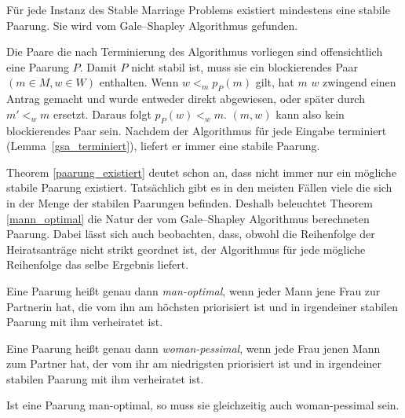 \begin{Theorem}
\label{paarung_existiert}
  Für jede Instanz des Stable Marriage Problems existiert mindestens eine stabile Paarung. Sie wird vom Gale–Shapley Algorithmus gefunden.
\end{Theorem}

\begin{Beweis}
\label{paarung_existiert_bew}
  Die Paare die nach Terminierung des Algorithmus vorliegen sind offensichtlich eine Paarung $P$. Damit $P$ nicht stabil ist, muss sie ein blockierendes Paar $(m \in M,w \in W)$ enthalten. Wenn $w <_{m} p_{P}(m)$ gilt, hat $m$ $w$ zwingend einen Antrag gemacht und wurde entweder direkt abgewiesen, oder später durch $m' <_{w} m$ ersetzt. Daraus folgt $p_{P}(w) <_{w} m$. $(m,w)$ kann also kein blockierendes Paar sein. Nachdem der Algorithmus für jede Eingabe terminiert (Lemma~\ref{gsa_terminiert}), liefert er immer eine stabile Paarung.
\end{Beweis}

Theorem \ref{paarung_existiert} deutet schon an, dass nicht immer nur ein mögliche stabile Paarung existiert. Tatsächlich gibt es in den meisten Fällen viele die sich in der Menge der stabilen Paarungen befinden. Deshalb beleuchtet Theorem \ref{mann_optimal} die Natur der vom Gale–Shapley Algorithmus berechneten Paarung. Dabei lässt sich auch beobachten, dass, obwohl die Reihenfolge der Heiratsanträge nicht strikt geordnet ist, der Algorithmus für jede mögliche Reihenfolge das selbe Ergebnis liefert.

\begin{Definition}
\label{man_optimal}
  Eine Paarung heißt genau dann \textit{man-optimal}, wenn jeder Mann jene Frau zur Partnerin hat, die vom ihn am höchsten priorisiert ist und in irgendeiner stabilen Paarung mit ihm verheiratet ist.
\end{Definition}

\begin{Definition}
\label{woman_pessimal}
  Eine Paarung heißt genau dann \textit{woman-pessimal}, wenn jede Frau jenen Mann zum Partner hat, der vom ihr am niedrigsten priorisiert ist und in irgendeiner stabilen Paarung mit ihm verheiratet ist.
\end{Definition}

\begin{Lemma}
\label{man_optimal_woman_pessimal}
  Ist eine Paarung man-optimal, so muss sie gleichzeitig auch woman-pessimal sein.
\end{Lemma}

